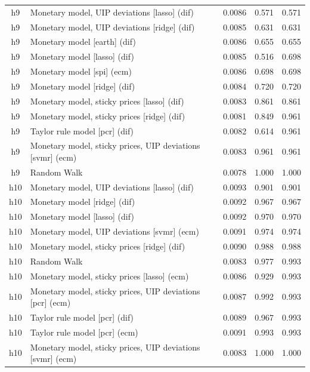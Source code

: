 \begin{ThreePartTable}
\begin{longtable}[t]{cp{5.5cm}ccc}
\addlinespace
h9 & \raggedright Monetary model, UIP deviations [lasso] (dif) & 0.0086 & 0.571 & 0.571\\
h9 & \raggedright Monetary model, UIP deviations [ridge] (dif) & 0.0085 & 0.631 & 0.631\\
h9 & \raggedright Monetary model [earth] (dif) & 0.0086 & 0.655 & 0.655\\
h9 & \raggedright Monetary model [lasso] (dif) & 0.0085 & 0.516 & 0.698\\
h9 & \raggedright Monetary model [spi] (ecm) & 0.0086 & 0.698 & 0.698\\
h9 & \raggedright Monetary model [ridge] (dif) & 0.0084 & 0.720 & 0.720\\
h9 & \raggedright Monetary model, sticky prices [lasso] (dif) & 0.0083 & 0.861 & 0.861\\
h9 & \raggedright Monetary model, sticky prices [ridge] (dif) & 0.0081 & 0.849 & 0.961\\
h9 & \raggedright Taylor rule model [pcr] (dif) & 0.0082 & 0.614 & 0.961\\
h9 & \raggedright Monetary model, sticky prices, UIP deviations [svmr] (ecm) & 0.0083 & 0.961 & 0.961\\
h9 & \raggedright Random Walk & 0.0078 & 1.000 & 1.000\\
\addlinespace
h10 & \raggedright Monetary model, UIP deviations [lasso] (dif) & 0.0093 & 0.901 & 0.901\\
h10 & \raggedright Monetary model [ridge] (dif) & 0.0092 & 0.967 & 0.967\\
h10 & \raggedright Monetary model [lasso] (dif) & 0.0092 & 0.970 & 0.970\\
h10 & \raggedright Monetary model, UIP deviations [svmr] (ecm) & 0.0091 & 0.974 & 0.974\\
h10 & \raggedright Monetary model, sticky prices [ridge] (dif) & 0.0090 & 0.988 & 0.988\\
h10 & \raggedright Random Walk & 0.0083 & 0.977 & 0.993\\
h10 & \raggedright Monetary model, sticky prices [lasso] (ecm) & 0.0086 & 0.929 & 0.993\\
h10 & \raggedright Monetary model, sticky prices, UIP deviations [pcr] (ecm) & 0.0087 & 0.992 & 0.993\\
h10 & \raggedright Taylor rule model [pcr] (dif) & 0.0089 & 0.967 & 0.993\\
h10 & \raggedright Taylor rule model [pcr] (ecm) & 0.0091 & 0.993 & 0.993\\
h10 & \raggedright Monetary model, sticky prices, UIP deviations [svmr] (ecm) & 0.0083 & 1.000 & 1.000\\

\end{longtable}
\end{ThreePartTable}
